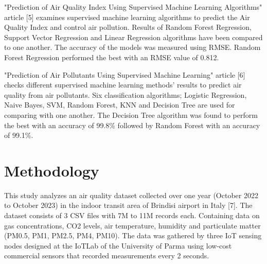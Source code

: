 \documentclass[conference]{IEEEtran}
\begin{document}
"Prediction of Air Quality Index Using Supervised Machine Learning Algorithms" article [5] examines supervised machine learning algorithms to predict the Air Quality Index and control air pollution. Results of Random Forest Regression, Support Vector Regression and Linear Regression algorithms have been compared to one another. The accuracy of the models was measured using RMSE. Random Forest Regression performed the best with an RMSE value of 0.812.
\vspace{5mm}

"Prediction of Air Pollutants Using Supervised Machine Learning" article [6] checks different supervised machine learning methods' results to predict air quality from air pollutants. Six classification algorithms; Logistic Regression, Naive Bayes, SVM, Random Forest, KNN and Decision Tree are used for comparing with one another. The Decision Tree algorithm was found to perform the best with an accuracy of 99.8\% followed by Random Forest with an accuracy of 99.1\%.
\vspace{5mm}

\section{Methodology}

This study analyzes an air quality dataset collected over one year (October 2022 to October 2023) in the indoor transit area of Brindisi airport in Italy [7]. The dataset consists of 3 CSV files with 7M to 11M records each. Containing data on gas concentrations, CO2 levels, air temperature, humidity and particulate matter (PM0.5, PM1, PM2.5, PM4, PM10). The data was gathered by three IoT sensing nodes designed at the IoTLab of the University of Parma using low-cost commercial sensors that recorded measurements every 2 seconds.
\vspace{5mm}
\end{document}
